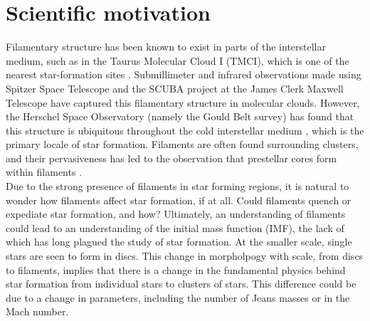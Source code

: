 \documentclass[a4paper,12pt]{article}
\begin{document}
\section{Scientific motivation}

Filamentary structure has been known to exist in parts of the interstellar medium, such as in the Taurus Molecular Cloud I (TMCI), which is one of the nearest star-formation sites \citep{nut08}. Submillimeter and infrared observations made using Spitzer Space Telescope and the SCUBA project at the James Clerk Maxwell Telescope have captured this filamentary structure in molecular clouds. However, the Herschel Space Observatory (namely the Gould Belt survey) has found that this structure is ubiquitous throughout the cold interstellar medium \citep{and10}, which is the primary locale of star formation. Filaments are often found surrounding clusters, and their pervasiveness has led to the observation that prestellar cores form within filaments \citep{arz11}.\\

Due to the strong presence of filaments in star forming regions, it is natural to wonder how filaments affect star formation, if at all. Could filaments quench or expediate star formation, and how? Ultimately, an understanding of filaments could lead to an understanding of the initial mass function (IMF), the lack of which has long plagued the study of star formation. At the smaller scale, single stars are seen to form in discs. This change in morpholpogy with scale, from discs to filaments, implies that there is a change in the fundamental physics behind star formation from individual stars to clusters of stars. This difference could be due to a change in parameters, including the number of Jeans masses or in the Mach number.\\
\end{document}
